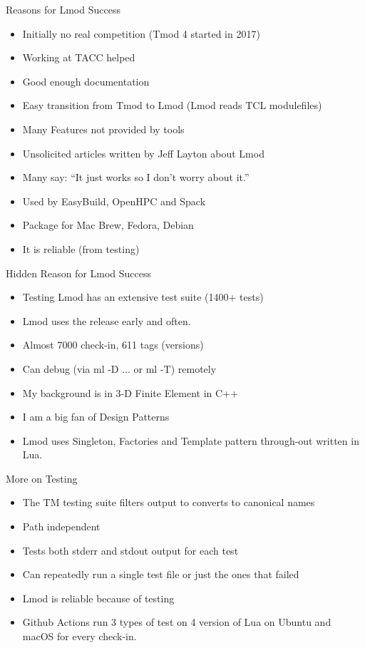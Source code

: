 \documentclass{beamer}
\begin{document}
\begin{frame}{Reasons for Lmod Success}
  \begin{itemize}
    \item Initially no real competition (Tmod 4 started in 2017)
    \item Working at TACC helped
    \item Good enough documentation
    \item Easy transition from Tmod to Lmod (Lmod reads TCL
      modulefiles)
    \item Many Features not provided by tools
    \item Unsolicited articles written by Jeff Layton about Lmod
    \item Many say: ``It just works so I don't worry about it.''
    \item Used by EasyBuild, OpenHPC and Spack
    \item Package for Mac Brew, Fedora, Debian
    \item It is reliable (from testing)
  \end{itemize}
\end{frame}

\begin{frame}{Hidden Reason for Lmod Success}
  \begin{itemize}
    \item Testing Lmod has an extensive test suite (1400+ tests)
    \item Lmod uses the release early and often.
    \item Almost 7000 check-in, 611 tags (versions)
    \item Can debug (via ml -D ... or ml -T) remotely
    \item My background is in 3-D Finite Element in C++
    \item I am a big fan of Design Patterns
    \item Lmod uses Singleton, Factories and Template pattern
      through-out written in Lua.
  \end{itemize}
\end{frame}

\begin{frame}{More on Testing}
  \begin{itemize}
    \item The TM testing suite filters output to converts to canonical
      names
    \item Path independent
    \item Tests both stderr and stdout output for each test
    \item Can repeatedly run a single test file or just the ones that
      failed
    \item Lmod is reliable because of testing
    \item Github Actions run 3 types of test on 4 version of Lua on
      Ubuntu and macOS for every check-in.
  \end{itemize}
\end{frame}
\end{document}
